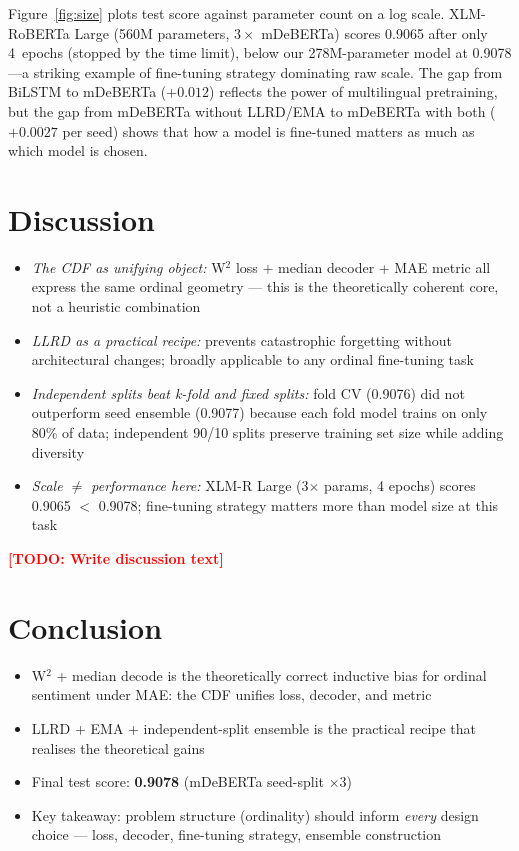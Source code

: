 \documentclass{article}
\newcommand{\TODO}[1]{\textcolor{red}{\textbf{[TODO: #1]}}}
\newcommand{\KP}[1]{\textit{#1}}   %
\begin{document}
Figure~\ref{fig:size} plots test score against parameter count on a
log scale.
XLM-RoBERTa Large (560M parameters, $3\times$ mDeBERTa) scores 0.9065
after only 4~epochs (stopped by the time limit), below our
278M-parameter model at 0.9078---a striking example of fine-tuning
strategy dominating raw scale.
The gap from BiLSTM to mDeBERTa ($+0.012$) reflects the power of
multilingual pretraining, but the gap from mDeBERTa without LLRD/EMA to
mDeBERTa with both ($+0.0027$ per seed) shows that how a model is fine-tuned
matters as much as which model is chosen.

\section{Discussion}
\label{sec:discussion}

\begin{itemize}[leftmargin=*,itemsep=1pt]
  \item \KP{The CDF as unifying object:} W$^2$ loss + median decoder + MAE metric
        all express the same ordinal geometry --- this is the theoretically
        coherent core, not a heuristic combination
  \item \KP{LLRD as a practical recipe:} prevents catastrophic forgetting
        without architectural changes; broadly applicable to any ordinal
        fine-tuning task
  \item \KP{Independent splits beat k-fold and fixed splits:} fold CV
        (0.9076) did not outperform seed ensemble (0.9077) because each fold
        model trains on only 80\% of data; independent 90/10 splits preserve
        training set size while adding diversity
  \item \KP{Scale $\neq$ performance here:} XLM-R Large (3$\times$ params,
        4 epochs) scores 0.9065 $<$ 0.9078; fine-tuning strategy matters
        more than model size at this task
\end{itemize}

\TODO{Write discussion text}

\section{Conclusion}
\label{sec:conclusion}

\begin{itemize}[leftmargin=*,itemsep=1pt]
  \item W$^2$ + median decode is the theoretically correct inductive bias
        for ordinal sentiment under MAE: the CDF unifies loss, decoder,
        and metric
  \item LLRD + EMA + independent-split ensemble is the practical recipe
        that realises the theoretical gains
  \item Final test score: \textbf{0.9078} (mDeBERTa seed-split ×3)
  \item Key takeaway: problem structure (ordinality) should inform
        \textit{every} design choice --- loss, decoder, fine-tuning strategy,
        ensemble construction
\end{itemize}
\end{document}
